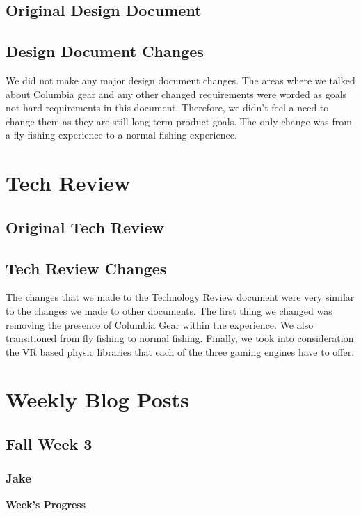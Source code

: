 \documentclass[10pt,journal,compsoc,onecolumn, draftclsnofoot]{IEEEtran}
\begin{document}
\subsection{Original Design Document}


\subsection{Design Document Changes}
We did not make any major design document changes. The areas where we talked about Columbia gear and any other changed requirements were worded as goals not hard requirements in this document. Therefore, we didn't feel a need to change them as they are still long term product goals. The only change was from a fly-fishing experience to a normal fishing experience.

\section{Tech Review}
\subsection{Original Tech Review}


\subsection{Tech Review Changes}
The changes that we made to the Technology Review document were very similar to the changes we made to other documents. The first thing we changed was removing the presence of Columbia Gear within the experience. We also transitioned from fly fishing to normal fishing. Finally, we took into consideration the VR based physic libraries that each of the three gaming engines have to offer.

\section{Weekly Blog Posts}

\subsection{Fall Week 3}
\subsubsection{Jake}
\noindent \textbf{Week's Progress}
\end{document}
